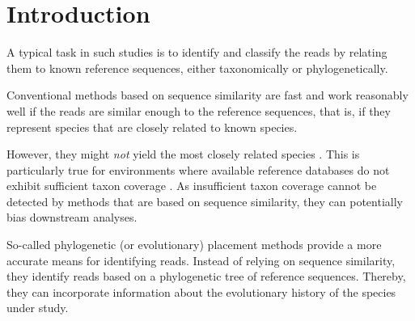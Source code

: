 \documentclass{bioinfo}
\newcommand\toolname{\textsc}
\newcommand\taxonname{\textit}
\newcommand\nicetohave[1]{{\color{RoyalBlue}{#1}}}
\renewcommand\nicetohave[1]{}
\begin{document}
\section{Introduction}
\label{sec:Introduction}


A typical task in such studies is to identify and classify the reads by
relating them to known reference sequences, either taxonomically or phylogenetically.

\nicetohave{
Conventional methods like \toolname{Blast} \citep{Altschul1990} are fast and work reasonably well
}
Conventional methods based on sequence similarity are fast and work reasonably well
if the reads are similar enough to the reference sequences,
that is, if they represent species that are closely related to known species.
\nicetohave{
However, the best \toolname{Blast} hit does often \emph{not} yield the most closely related species \citep{Koski2001}.
}
However, they might \emph{not} yield the most closely related species \citep{Koski2001}.
This is particularly true for environments where available reference databases
do not exhibit sufficient taxon coverage \citep{Mahe2017}.
As insufficient taxon coverage cannot be detected by methods that are based on sequence similarity,
they can potentially bias downstream analyses.

So-called phylogenetic (or evolutionary) placement methods \citep{Matsen2010,Berger2011,Barbera2018}
provide a more accurate means for identifying reads.
Instead of relying on sequence similarity,
they identify reads based on a phylogenetic tree of reference sequences.
Thereby, they can incorporate information about the evolutionary history of the species under study.
\end{document}
